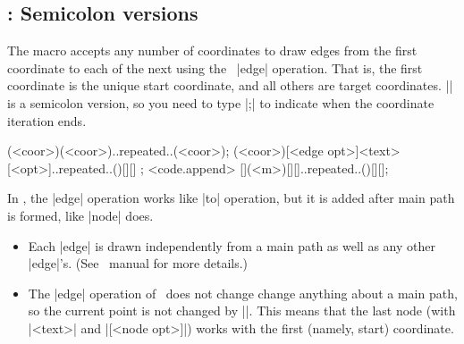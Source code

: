 \subsection{\protect\cmd{\tzedges(+)}: Semicolon versions}
\label{ss:tzedges}

The macro \icmd{\tzedges} accepts any number of coordinates to draw edges from the first coordinate to each of the next using the \Tikz\ |edge| operation. That is, the first coordinate is the unique start coordinate, and all others are target coordinates.
|\tzedges| is a semicolon version, so you need to type |;| to indicate when the coordinate iteration ends.


\begin{tzdef}
\tzedges(<coor>)(<coor>)..repeated..(<coor>);
        (<coor>)[<edge opt>]{<text>}[<opt>]..repeated..()[]{}[] ; <code.append>
  [](<m>)[]{}[]..repeated..()[]{}[];
\end{tzdef}

\remark In \Tikz, the |edge| operation works like |to| operation, but it is added after main path is formed, like |node| does.
\begin{itemize}\firmlist
\item Each |edge| is drawn independently from a main path as well as any other |edge|'s. (See \Tikz\ manual for more details.)
\item The |edge| operation of \Tikz\ does not change change anything about a main path, so the current point is not changed by |\tzedges|. This means that the last node (with |{<text>}| and |[<node opt>]|) works with the first (namely, start) coordinate.
\end{itemize}





\begin{tzcode}{.3}
{}
\end{tzcode}


